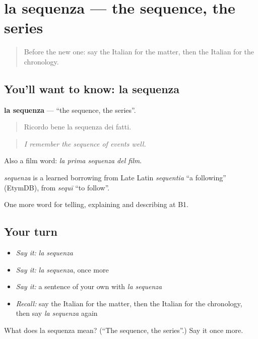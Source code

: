 \section[la sequenza]{la sequenza — the sequence, the series}

\label{lesson:IT-C276-sequenza}



\begin{quote}
Before the new one: say the Italian for the matter, then the Italian for the chronology.
\end{quote}

\subsection*{You'll want to know: la sequenza}
\textbf{la sequenza} — \textquotedblleft{}the sequence, the series\textquotedblright{}.

\begin{quote}
Ricordo bene la sequenza dei fatti.
\end{quote}

\begin{quote}
\emph{I remember the sequence of events well.}
\end{quote}

Also a film word: \emph{la prima sequenza del film}.

\begin{cousinweb}
\emph{sequenza} is a learned borrowing from Late Latin \emph{sequentia} \textquotedblleft{}a following\textquotedblright{} (EtymDB), from \emph{sequī} \textquotedblleft{}to follow\textquotedblright{}.
\end{cousinweb}

\begin{grammarlens}[title={What you've built}]
One more word for telling, explaining and describing at B1.
\end{grammarlens}

\subsection*{Your turn}
\begin{itemize}
\raggedright
  \item \emph{Say it:} \emph{la sequenza}
  \item \emph{Say it:} \emph{la sequenza}, once more
  \item \emph{Say it:} a sentence of your own with \emph{la sequenza}
  \item \emph{Recall:} say the Italian for the matter, then the Italian for the chronology, then say \emph{la sequenza} again
\end{itemize}

\begin{tcolorbox}[breakable,colback=teal!4,colframe=teal!35!black,title={Before you move on}]
What does la sequenza mean? (\textquotedblleft{}The sequence, the series\textquotedblright{}.) Say it once more.
\end{tcolorbox}
